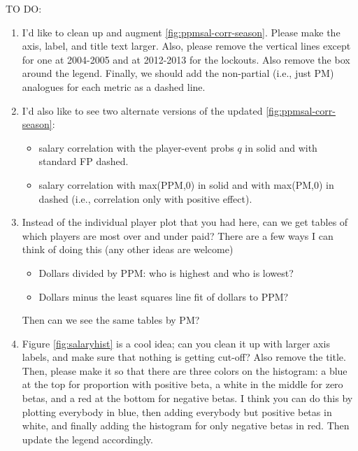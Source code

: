 {\color{red}  TO DO: 
\begin{enumerate}
    \item I'd like to clean up and augment \ref{fig:ppmsal-corr-season}.  Please make the axis, label, and title text larger.  Also, please remove the vertical lines except for one at 2004-2005 and at 2012-2013 for the lockouts.  Also remove the box around the legend. Finally, we should add the non-partial (i.e., just PM) analogues for each metric as a dashed line.
    \item I'd also like to see two alternate versions of the updated \ref{fig:ppmsal-corr-season}: 
    \begin{itemize}
    \item salary correlation with the player-event probs $q$ in solid and with standard FP dashed.
    \item salary correlation with max(PPM,0) in solid and with max(PM,0) in dashed (i.e., correlation only with positive effect).
    \end{itemize}
    \item Instead of the individual player plot that you had here, can we get tables of which players are most over and under paid? There are a few ways I can think of doing this (any other ideas are welcome)
    \begin{itemize}
    \item Dollars divided by PPM: who is highest and who is lowest?
    \item Dollars minus the least squares line fit of dollars to PPM?
    \end{itemize}
    Then can we see the same tables by PM?
    \item Figure \ref{fig:salaryhist} is a cool idea; can you clean it up with larger axis labels, and make sure that nothing is getting cut-off?  Also remove the title.  Then, please make it so that there are three colors on the histogram: a blue at the top for proportion with positive beta, a white in the middle for zero betas, and a red at the bottom for negative betas.  I think you can do this by plotting everybody in blue, then adding everybody but positive betas in white, and finally adding the histogram for only negative betas in red.  Then update the legend accordingly.
\end{enumerate}}

